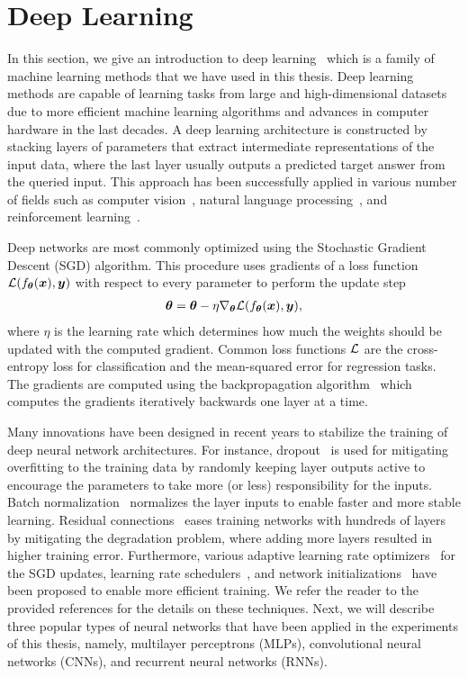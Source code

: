 \section{Deep Learning}\label{sec:deep_learning}

In this section, we give an introduction to deep learning~\cite{goodfellow2016deep} which is a family of machine learning methods that we have used in this thesis. 
Deep learning methods are capable of learning tasks from large and high-dimensional datasets due to more efficient machine learning algorithms and advances in computer hardware in the last decades. A deep learning architecture is constructed by stacking layers of parameters that extract intermediate representations of the input data, where the last layer usually outputs a predicted target answer from the queried input. This approach has been successfully applied in various number of fields such as computer vision~\cite{he2016deep, krizhevsky2012imagenet}, natural language processing~\cite{devlin2018bert}, and reinforcement learning~\cite{mnih2015human, silver2016mastering}. 

Deep networks are most commonly optimized using the Stochastic Gradient Descent (SGD) algorithm. This procedure uses gradients of a loss function ${\mathcal{L}}(f_{{\bm{\theta}}}({\bm{x}}), {\bm{y}})$ with respect to every parameter to perform the update step
\begin{align}\label{eq:weight_update_sgd}
	{\bm{\theta}} = {\bm{\theta}} - \eta \nabla_{{\bm{\theta}}} {\mathcal{L}}(f_{{\bm{\theta}}}({\bm{x}}), {\bm{y}}),
\end{align} 
where $\eta$ is the learning rate which determines how much the weights should be updated with the computed gradient. Common loss functions ${\mathcal{L}}$ are the cross-entropy loss for classification and the mean-squared error for regression tasks. The gradients are computed using the backpropagation algorithm~\cite{rumelhart1986learning} which computes the gradients iteratively backwards one layer at a time. 

Many innovations have been designed in recent years to stabilize the training of deep neural network architectures. For instance, dropout~\cite{srivastava2014dropout} is used for mitigating overfitting to the training data by randomly keeping layer outputs active to encourage the parameters to take more (or less) responsibility for the inputs. Batch normalization~\cite{ioffe2015batch, santurkar2018does} normalizes the layer inputs to enable faster and more stable learning. Residual connections~\cite{he2016deep} eases training networks with hundreds of layers by mitigating the degradation problem, where adding more layers resulted in higher training error. Furthermore, various adaptive learning rate optimizers~\cite{kingma2014adam,liu2019variance,tieleman2012lecture} for the SGD updates, learning rate schedulers~\cite{smith2017cyclical}, and network initializations~\cite{glorot2010understanding, he2015delving} have been proposed to enable more efficient training. We refer the reader to the provided references for the details on these techniques.
Next, we will describe three popular types of neural networks that have been applied in the experiments of this thesis, namely, multilayer perceptrons (MLPs), convolutional neural networks (CNNs), and recurrent neural networks (RNNs).

